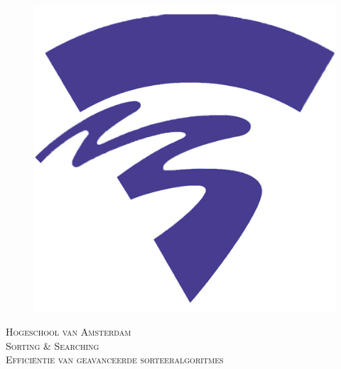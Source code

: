 \documentclass[12pt,notitlepage]{article}
\begin{document}

\begin{titlepage}

\newcommand{\HRule}{\rule{\linewidth}{0.5mm}}

\center %

\begin{figure}[h!]
\centering
\includegraphics[scale=0.5]{hva-logo.png}
\end{figure}
\textsc{\LARGE Hogeschool van Amsterdam}\\[1.5cm] %
\textsc{\Large Sorting \& Searching}\\[0.5cm] %
\textsc{\large Efficiëntie van geavanceerde sorteeralgoritmes}\\[0.5cm] %



\end{titlepage}
\end{document}
